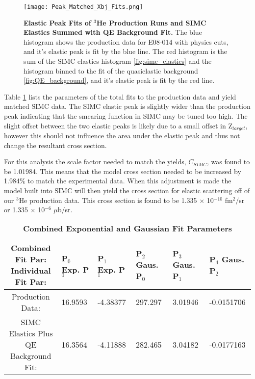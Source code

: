 \begin{figure}[!ht]
\begin{center}
\texttt{[image: Peak\_Matched\_Xbj\_Fits.png]}
\end{center}
\caption[Elastic Peak Fits of $^{3}$He Production Runs and SIMC Elastics Summed with QE Background Fit]{
{\bf{Elastic Peak Fits of $^{3}$He Production Runs and SIMC Elastics Summed with QE Background Fit.}} The blue histogram shows the production data for E08-014 with physics cuts, and it's elastic peak is fit by the blue line. The red histogram is the sum of the SIMC elastics histogram \ref{fig:simc_elastics} and the histogram binned to the fit of the quasielastic background \ref{fig:QE_background}, and it's elastic peak is fit by the red line.}
\label{fig:final_xs}
\end{figure}

Table \ref{tab:peak_pars} lists the parameters of the total fits to the production data and yield matched SIMC data. The SIMC elastic peak is slightly wider than the production peak indicating that the smearing function in SIMC may be tuned too high. The slight offset between the two elastic peaks is likely due to a small offset in Z$_{target}$, however this should not influence the area under the elastic peak and thus not change the resultant cross section. 

For this analysis the scale factor needed to match the yields, $C_{SIMC}$, was found to be 1.01984. This means that the model cross section needed to be increased by 1.984$\%$ to match the experimental data. When this adjustment is made the model built into SIMC will then yield the cross section for elastic scattering off of our $^3$He production data. This cross section is found to be 1.335 $\times$ 10$^{-10}$ fm$^2$/sr or 1.335 $\times$ 10$^{-6}$ $\mu$b/sr.

\vspace{5mm}

\begin{table}[!h]
\centering
\begin{tabular}{|c | l l l l l|}
\hline
\makecell{\textbf{Combined Fit Par:}\\ \textbf{Individual Fit Par:}} & \makecell{\textbf{P$_0$}\\ \textbf{Exp. P$_0$}} & \makecell{\textbf{P$_1$}\\ \textbf{Exp. P$_1$}} & \makecell{\textbf{P$_2$}\\ \textbf{Gaus. P$_0$}} & \makecell{\textbf{P$_3$}\\ \textbf{Gaus. P$_1$}} & \makecell{\textbf{P$_4$}\\ \textbf{Gaus. P$_2$}}\\
\hline
Production Data: & 16.9593 & -4.38377 & 297.297 & 3.01946 & -0.0151706 \\ 
\makecell{SIMC Elastics Plus\\ QE Background Fit}: & 16.3564 & -4.11888 & 282.465 & 3.04182 & -0.0177163 \\ 
\hline
\end{tabular}
\caption[Combined Exponential and Gaussian Fit Parameters]{{\bf{Combined Exponential and Gaussian Fit Parameters}} }
\label{tab:peak_pars}
\end{table}


